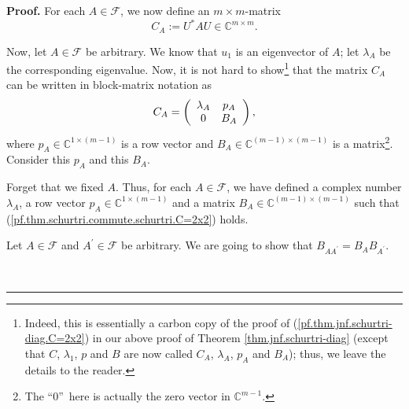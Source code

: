 \documentclass[numbers=enddot,12pt,final,onecolumn,notitlepage]{scrartcl}%
\numberwithin{exer}{subsection}
\theoremstyle{definition}
\newenvironment{proof}[1][Proof]{\noindent\textbf{#1.} }{\ \rule{0.5em}{0.5em}}
\begin{document}
\begin{proof}
For each $A\in\mathcal{F}$, we now define an $m\times m$-matrix%
\[
C_{A}:=U^{\ast}AU\in\mathbb{C}^{m\times m}.
\]


Now, let $A\in\mathcal{F}$ be arbitrary. We know that $u_{1}$ is an
eigenvector of $A$; let $\lambda_{A}$ be the corresponding eigenvalue. Now, it
is not hard to show\footnote{Indeed, this is essentially a carbon copy of the
proof of (\ref{pf.thm.jnf.schurtri-diag.C=2x2}) in our above proof of Theorem
\ref{thm.jnf.schurtri-diag} (except that $C$, $\lambda_{1}$, $p$ and $B$ are
now called $C_{A}$, $\lambda_{A}$, $p_{A}$ and $B_{A}$); thus, we leave the
details to the reader.} that the matrix $C_{A}$ can be written in block-matrix
notation as%
\begin{equation}
C_{A}=\left(
\begin{array}
[c]{cc}%
\lambda_{A} & p_{A}\\
0 & B_{A}%
\end{array}
\right)  , \label{pf.thm.schurtri.commute.schurtri.C=2x2}%
\end{equation}
where $p_{A}\in\mathbb{C}^{1\times\left(  m-1\right)  }$ is a row vector and
$B_{A}\in\mathbb{C}^{\left(  m-1\right)  \times\left(  m-1\right)  }$ is a
matrix\footnote{The \textquotedblleft$0$\textquotedblright\ here is actually
the zero vector in $\mathbb{C}^{m-1}$.}. Consider this $p_{A}$ and this
$B_{A}$.

Forget that we fixed $A$. Thus, for each $A\in\mathcal{F}$, we have defined a
complex number $\lambda_{A}$, a row vector $p_{A}\in\mathbb{C}^{1\times\left(
m-1\right)  }$ and a matrix $B_{A}\in\mathbb{C}^{\left(  m-1\right)
\times\left(  m-1\right)  }$ such that
(\ref{pf.thm.schurtri.commute.schurtri.C=2x2}) holds.

Let $A\in\mathcal{F}$ and $A^{\prime}\in\mathcal{F}$ be arbitrary. We are
going to show that $B_{AA^{\prime}}=B_{A}B_{A^{\prime}}$.


\end{proof}
\end{document}
